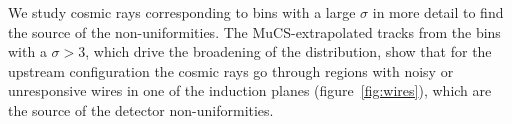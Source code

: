 \documentclass[a4paper,11pt]{article}
\begin{document}
%

 We study cosmic rays corresponding to bins with a large $\sigma$ in more detail to find the source of the non-uniformities. The MuCS-extrapolated tracks from the bins with a $\sigma>3$, which drive the broadening of the distribution, show that for the upstream configuration the cosmic rays go through regions with noisy or unresponsive wires in one of the induction planes (figure~\ref{fig:wires}), which are the source of the detector non-uniformities.
\end{document}
